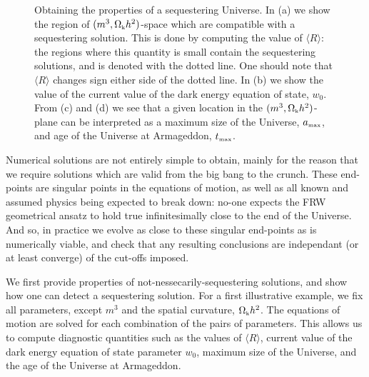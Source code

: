 \documentclass[amsmath,amssymb,10pt,twocolumn,eqsecnum]{revtex4}
\begin{document}
\begin{figure}[!t]
\begin{center}
      \end{center}
\caption{Obtaining the  properties of a sequestering Universe.  In (a) we  show the region of $(m^3,{\Omega}_{\scriptscriptstyle{\textrm{k}}}h^2)$-space which are compatible with a sequestering solution. This is done by computing the value of $\langle R\rangle$: the regions where this quantity is small contain the sequestering solutions, and is denoted with the dotted line. One should note that $\langle R\rangle$ changes sign either side of the dotted line. In (b) we show the value of the current value of the dark energy equation of state, $w_0$.  From (c) and (d) we see that a given location in the $(m^3,{\Omega}_{\scriptscriptstyle{\textrm{k}}}h^2)$-plane can be interpreted as a maximum size of the Universe,   ${a}_{\scriptscriptstyle{\textrm{max}}}$, and age of the Universe at Armageddon, ${t}_{\scriptscriptstyle{\textrm{max}}}$.}\label{fig:plots3}
\end{figure}

 
 
%

Numerical solutions are not entirely simple to obtain, mainly for the reason that we require solutions which are valid from the big bang to the crunch. These end-points are singular points in the equations of motion, as well as all known and assumed physics being expected to break down: no-one expects the FRW geometrical ansatz to hold true infinitesimally close to the end of the Universe. And so, in practice we evolve as close to these singular end-points as is numerically viable, and check that any resulting conclusions are independant (or at least converge) of the cut-offs imposed.
 
We first provide properties of not-nessecarily-sequestering solutions, and show how one can detect a sequestering solution. For a first illustrative example, we fix all parameters, except $m^3$ and the spatial curvature, ${\Omega}_{\scriptscriptstyle{\textrm{k}}}h^2$. The equations of motion are solved for each combination of the pairs of parameters. This allows us to compute diagnostic quantities such as the values of $\langle R\rangle$, current value of the dark energy equation of state parameter $w_0$, maximum size of the Universe, and the age of the Universe at Armageddon.
\end{document}
